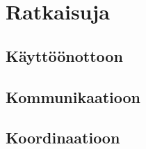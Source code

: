 \chapter{Ratkaisuja\label{aihe-2}}

\section{Käyttöönottoon}

\section{Kommunikaatioon}

\section{Koordinaatioon}

